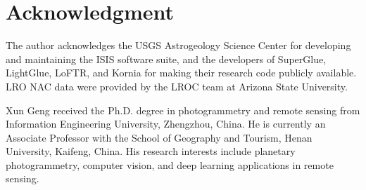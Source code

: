 \documentclass[lettersize,journal]{IEEEtran}
\begin{document}

\section*{Acknowledgment}

The author acknowledges the USGS Astrogeology Science Center for developing and maintaining the ISIS software suite, and the developers of SuperGlue, LightGlue, LoFTR, and Kornia for making their research code publicly available. LRO NAC data were provided by the LROC team at Arizona State University.






\begin{IEEEbiographynophoto}{Xun Geng}
received the Ph.D. degree in photogrammetry and remote sensing from Information Engineering University, Zhengzhou, China. He is currently an Associate Professor with the School of Geography and Tourism, Henan University, Kaifeng, China. His research interests include planetary photogrammetry, computer vision, and deep learning applications in remote sensing.
\end{IEEEbiographynophoto}
\end{document}
